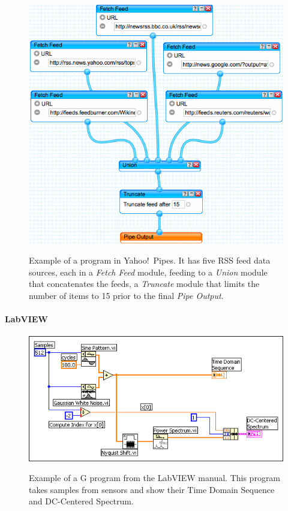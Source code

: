 \documentclass[10pt,conference,compsocconf]{IEEEtran}
\begin{document}
\begin{figure}
\caption{Example of a program in Yahoo!\ Pipes. It has five RSS feed data sources, each in a \emph{Fetch Feed} module, feeding to a \emph{Union} module that concatenates the feeds, a \emph{Truncate} module that limits the number of items to 15 prior to the final \emph{Pipe Output}. }
\centering
\includegraphics[width=\columnwidth]{yp-1}
\label{fig:ypexample}
\end{figure}


\paragraph{LabVIEW}
\begin{figure}
\caption{Example of a G program from the LabVIEW manual. This program takes samples from sensors and show their Time Domain Sequence and DC-Centered Spectrum.}
\centering
\includegraphics[width=\columnwidth]{labview-1}
\label{fig:labviewexample}
\end{figure}
\end{document}
